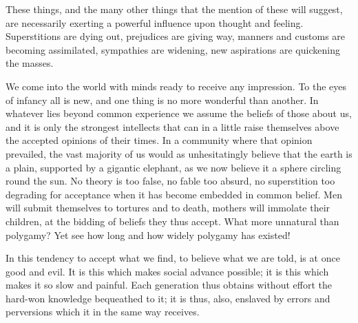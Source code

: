 \documentclass{book}
\begin{document}
These things, and the many other things that the mention of these will suggest, are necessarily exerting a powerful influence upon thought and feeling. Superstitions are dying out, prejudices are giving way, manners and customs are becoming assimilated, sympathies are widening, new aspirations are quickening the masses.

We come into the world with minds ready to receive any impression. To the eyes of infancy all is new, and one thing is no more wonderful than another. In whatever lies beyond common experience we assume the beliefs of those about us, and it is only the strongest intellects that can in a little raise themselves above the accepted opinions of their times. In a community where that opinion prevailed, the vast majority of us would as unhesitatingly believe that the earth is a plain, supported by a gigantic elephant, as we now believe it a sphere circling round the sun. No theory is too false, no fable too absurd, no superstition too degrading for acceptance when it has become embedded in common belief. Men will submit themselves to tortures and to death, mothers will immolate their children, at the bidding of beliefs they thus accept. What more unnatural than polygamy? Yet see how long and how widely polygamy has existed!

In this tendency to accept what we find, to believe what we are told, is at once good and evil. It is this which makes social advance possible; it is this which makes it so slow and painful. Each generation thus obtains without effort the hard-won knowledge bequeathed to it; it is thus, also, enslaved by errors and perversions which it in the same way receives.
\end{document}
